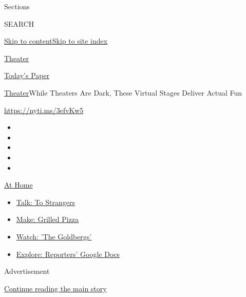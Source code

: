 Sections

SEARCH

\protect\hyperlink{site-content}{Skip to
content}\protect\hyperlink{site-index}{Skip to site index}

\href{https://www.nytimes.com/section/theater}{Theater}

\href{https://myaccount.nytimes.com/auth/login?response_type=cookie\&client_id=vi}{}

\href{https://www.nytimes.com/section/todayspaper}{Today's Paper}

\href{/section/theater}{Theater}\textbar{}While Theaters Are Dark, These
Virtual Stages Deliver Actual Fun

\url{https://nyti.ms/3efvKw5}

\begin{itemize}
\item
\item
\item
\item
\item
\end{itemize}

\href{https://www.nytimes.com/spotlight/at-home?action=click\&pgtype=Article\&state=default\&region=TOP_BANNER\&context=at_home_menu}{At
Home}

\begin{itemize}
\tightlist
\item
  \href{https://www.nytimes.com/2020/08/03/well/family/the-benefits-of-talking-to-strangers.html?action=click\&pgtype=Article\&state=default\&region=TOP_BANNER\&context=at_home_menu}{Talk:
  To Strangers}
\item
  \href{https://www.nytimes.com/2020/08/01/at-home/coronavirus-make-pizza-on-a-grill.html?action=click\&pgtype=Article\&state=default\&region=TOP_BANNER\&context=at_home_menu}{Make:
  Grilled Pizza}
\item
  \href{https://www.nytimes.com/2020/07/31/arts/television/goldbergs-abc-stream.html?action=click\&pgtype=Article\&state=default\&region=TOP_BANNER\&context=at_home_menu}{Watch:
  'The Goldbergs'}
\item
  \href{https://www.nytimes.com/interactive/2020/at-home/even-more-reporters-editors-diaries-lists-recommendations.html?action=click\&pgtype=Article\&state=default\&region=TOP_BANNER\&context=at_home_menu}{Explore:
  Reporters' Google Docs}
\end{itemize}

Advertisement

\protect\hyperlink{after-top}{Continue reading the main story}

